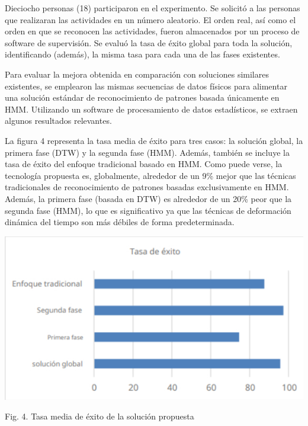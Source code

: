 \documentclass[10pt]{article}
\begin{document}
Dieciocho personas (18) participaron en el experimento. Se solicitó a las personas que realizaran las actividades en un número aleatorio. El orden real, así como el orden en que se reconocen las actividades, fueron almacenados por un proceso de software de supervisión. Se evaluó la tasa de éxito global para toda la solución, identificando (además), la misma tasa para cada una de las fases existentes.
\newline

Para evaluar la mejora obtenida en comparación con soluciones similares existentes, se emplearon las mismas secuencias de datos físicos para alimentar una solución estándar de reconocimiento de patrones basada únicamente en HMM. Utilizando un software de procesamiento de datos estadísticos, se extraen algunos resultados relevantes.
\newline

La figura 4 representa la tasa media de éxito para tres casos: la solución global, la primera fase (DTW) y la segunda fase (HMM). Además, también se incluye la tasa de éxito del enfoque tradicional basado en HMM. Como puede verse, la tecnología propuesta es, globalmente, alrededor de un 9\% mejor que las técnicas tradicionales de reconocimiento de patrones basadas exclusivamente en HMM. Además, la primera fase (basada en DTW) es alrededor de un 20\% peor que la segunda fase (HMM), lo que es significativo ya que las técnicas de deformación dinámica del tiempo son más débiles de forma predeterminada.


\includegraphics[max width=\textwidth]{2022_09_15_69d89c46b49bb93649d1g-09}

Fig. 4. Tasa media de éxito de la solución propuesta
\end{document}
